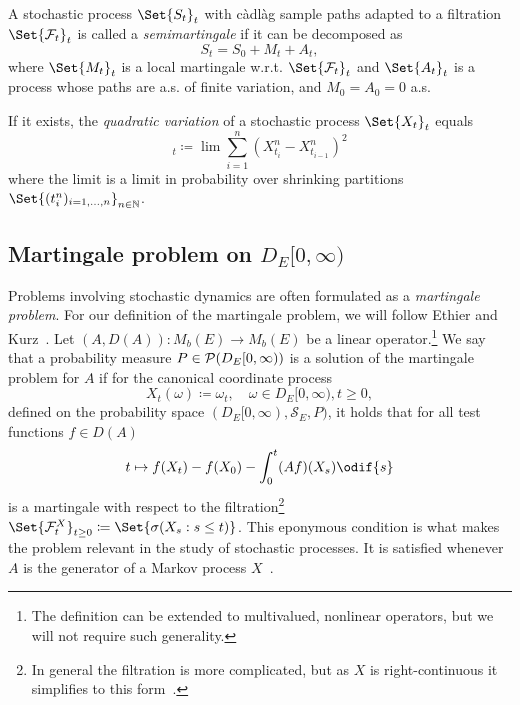 \begin{definition}
  A stochastic process \(\Set{S_t}_{t}\) with càdlàg sample paths adapted to a filtration \(\Set{\cF_t}_t\) is called a \textit{semimartingale} if it can be decomposed as
  \begin{equation}
    S_t = S_0 + M_t + A_t,
  \end{equation}
  where \( \Set{M_t}_{t} \) is a local martingale w.r.t. \(\Set{\cF_t}_t\) and \( \Set{A_t}_{t} \) is a process whose paths are a.s. of finite variation, and \( M_0 = A_0 = 0 \) a.s.
\end{definition}

\begin{definition}
  If it exists, the \textit{quadratic variation} of a stochastic process \(\Set{X_t}_{t}\) equals
  \begin{equation}
    [X]_t \coloneqq \lim \sum_{i=1}^n (X_{t_i}^n - X_{t_{i-1}}^n)^2
  \end{equation}
  where the limit is a limit in probability over shrinking partitions \(\Set{(t_i^n)_{i=1,\dots,n}}_{n\in\bN}\).
\end{definition}



\subsection{Martingale problem on \texorpdfstring{\(D_E[0,\infty)\)}{D([0,infinity), E)}}\label{sec:martingale-problem}

Problems involving stochastic dynamics are often formulated as a \textit{martingale problem}.
For our definition of the martingale problem, we will follow Ethier and Kurz~\cite[p.174]{ethierMarkovProcessesCharacterization1985}.
Let \((A, D(A)) : M_b(E) \to M_b(E)\) be a linear operator.\footnote{The definition can be extended to multivalued, nonlinear operators, but we will not require such generality.}
We say that a probability measure \(P \in \mathcal{P}(D_E[0,\infty))\) is a solution of the martingale problem for \( A \) if for the canonical coordinate process
\begin{equation}
  X_t(\omega) \coloneqq \omega_t, \quad \omega \in D_E[0,\infty), t \geq 0,
\end{equation}
defined on the probability space \((D_E[0,\infty), \mathscr{S}_E, P)\), it holds that for all test functions \(f \in D(A)\)
\begin{equation}\label{eq:mart-problem}
  t \mapsto f(X_t) - f(X_0) - \int_0^t (Af)(X_s) \odif{s}
\end{equation}
is a martingale with respect to the filtration\footnote{In general the filtration is more complicated, but as \( X \) is right-continuous it simplifies to this form~\cite[eq. (4.3.2) and below]{ethierMarkovProcessesCharacterization1985}.} \(\Set{\cF_t^X}_{t\geq0} \coloneqq \Set{\sigma(X_s : s \leq t)}\). %
This eponymous condition is what makes the problem relevant in the study of stochastic processes.
It is satisfied whenever \(A\) is the generator of a Markov process \(X\)~\cite[161-162]{ethierMarkovProcessesCharacterization1985}.

